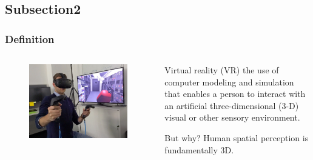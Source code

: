 \documentclass[10pt, xcolor=x11names,compress]{beamer}
\begin{document}
\subsection{Subsection2}
\begin{frame}
\frametitle{Definition}
	\begin{columns}
	\begin{column}{0.45\textwidth}
		\begin{figure}
			\centering
			\includegraphics[width=\textwidth]{images/vr.jpg}
		\end{figure}
	\end{column}
	\begin{column}{0.55\textwidth}
		\begin{alertblock}{Virtual reality (VR)}
			the use of computer modeling and simulation that enables a person to interact with an artificial three-dimensional (3-D) visual or other sensory environment.
		\end{alertblock}
		\begin{block}{But why?}
			Human spatial perception is fundamentally 3D.
		\end{block}
	\end{column}
\end{columns}
\end{frame}
\end{document}
